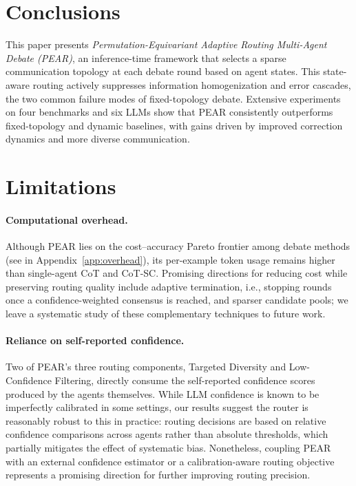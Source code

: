 \documentclass[11pt]{article}
\begin{document}







\section{Conclusions}
This paper presents \textit{Permutation-Equivariant Adaptive Routing Multi-Agent Debate (PEAR)}, an inference-time framework that selects a sparse communication topology at each debate round based on agent states. This state-aware routing actively suppresses information homogenization and error cascades, the two common failure modes of fixed-topology debate. Extensive experiments on four benchmarks and six LLMs show that PEAR consistently outperforms fixed-topology and dynamic baselines, with gains driven by improved correction dynamics and more diverse communication.




\section*{Limitations}

\paragraph{Computational overhead.}
Although PEAR lies on the cost--accuracy Pareto frontier among debate methods (see in Appendix~\ref{app:overhead}), its per-example token usage %
remains higher than %
single-agent CoT %
and CoT-SC. %
Promising directions for reducing cost while preserving routing quality include adaptive termination, i.e., stopping rounds once a confidence-weighted consensus is reached, and sparser candidate pools; we leave a systematic study of these complementary techniques to future work.

\paragraph{Reliance on self-reported confidence.}
Two of PEAR's three routing components, Targeted Diversity and Low-Confidence Filtering, directly consume the self-reported confidence scores produced by the agents themselves. While LLM confidence is known to be imperfectly calibrated in some settings, our results suggest the router is reasonably robust to this in practice: routing decisions are based on relative confidence comparisons across agents rather than absolute thresholds, which partially mitigates the effect of systematic bias. Nonetheless, coupling PEAR with an external confidence estimator or a calibration-aware routing objective represents a promising direction for further improving routing precision.
 
\end{document}
